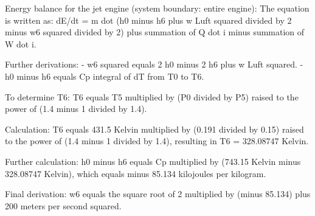 Energy balance for the jet engine (system boundary: entire engine):  
The equation is written as:  
dE/dt = m dot (h0 minus h6 plus w Luft squared divided by 2 minus w6 squared divided by 2) plus summation of Q dot i minus summation of W dot i.  

Further derivations:  
- w6 squared equals 2 h0 minus 2 h6 plus w Luft squared.  
- h0 minus h6 equals Cp integral of dT from T0 to T6.  

To determine T6:  
T6 equals T5 multiplied by (P0 divided by P5) raised to the power of (1.4 minus 1 divided by 1.4).  

Calculation:  
T6 equals 431.5 Kelvin multiplied by (0.191 divided by 0.15) raised to the power of (1.4 minus 1 divided by 1.4), resulting in T6 = 328.08747 Kelvin.  

Further calculation:  
h0 minus h6 equals Cp multiplied by (743.15 Kelvin minus 328.08747 Kelvin), which equals minus 85.134 kilojoules per kilogram.  

Final derivation:  
w6 equals the square root of 2 multiplied by (minus 85.134) plus 200 meters per second squared.
